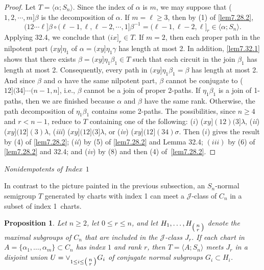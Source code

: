 \documentclass{surv-l}
\numberwithin{equation}{section}
\numberwithin{table}{section}
\numberwithin{figure}{section}
\theoremstyle{plain}
\newtheorem{proposition}[equation]{Proposition}
\theoremstyle{definition}
\begin{document}
\begin{proof} Let $T=\langle \alpha;S_{n}\rangle$. Since the index of $\alpha$ is
$m$, we may suppose that ($1, 2,\cdots,  m]\beta$ is the
decomposition of $\alpha$. If $m=\ell\geq 3$, then by (1) of
\ref{lem7.28.2},
\[
(12\cdots \ell]\beta\circ(\ell-1, \ell, \ell-2, \cdots, 1]\beta^{-1}=(\ell-1,
\ell-2, \ell]_{r}\in\langle\alpha;S_{n}\rangle.
\]
Applying 32.4, we conclude that $(ix]_{r}\in T$. If $m=2$, then
each proper path in the nilpotent part ($xy]\eta_{1}$ of
$\alpha=(xy]\eta_{1}\gamma$ has length at most 2. In addition,
\ref{lem7.32.1} shows that there exists
$\beta=(xy]\eta_{1}\beta_{1}\in T$ such that each circuit in the
join $\beta_{1}$ has length at most 2. Consequently, every path in
$(xy]\eta_{1}\beta_{1}=\beta$ has length at most 2. And since
$\beta$ and $\alpha$ have the same nilpotent part, $\beta$ cannot
be conjugate to ($12](34]\cdots(n-1, n]$, i.e., $\beta$ cannot be
a join of proper 2-paths. If $\eta_{1}\beta_{1}$ is a join of
1-paths, then we are finished because $\alpha$ and $\beta$ have
the same rank. Otherwise, the path decomposition of
$\eta_{1}\beta_{1}$ contains some 2-paths. The possibilities,
since $n \geq 4$ and $r <n -1$, reduce to $T$ containing one of
the following: ($i$) ($xy](12)(3]\lambda$, (\emph{ii})
($xy](12](3)\lambda$, (\emph{iii}) ($xy](12](3]\lambda$, or
(\emph{iv}) ($xy](12](34)\sigma$. Then ($i$) gives the result by
(4) of \ref{lem7.28.2}; (\emph{ii}) by (5) of \ref{lem7.28.2} and
Lemma 32.4; $(iii)$ by (6) of \ref{lem7.28.2} and 32.4; and
(\emph{iv}) by (8) and then (4) of~\ref{lem7.28.2}.
\end{proof}

\emph{Nonidempotents of Index~$1$}

In contrast to the picture painted in the previous subsection, an
$S_{n}$-normal semigroup $T$ generated by charts with index 1 can
meet a $\mathcal{J}$-class of $C_{n}$ in a subset of index
1~charts.

\begin{proposition}\label{prop7.32.6}
Let $n \geq 2$, let $0\leq r\leq n$, and let $H_{1},\ldots,
H_{\big(\kern0.5pt\begin{smallmatrix}{n}\\ {r}\end{smallmatrix}\kern0.5pt\big)}$
denote the maximal subgroups of $C_{n}$ that are included in the
$\mathcal{J}$-class $J_{r}$. If each chart in $A =
\{\alpha_{1},\ldots, \alpha_{m}\}\subset C_{n}$ has index $1$ and
rank $r$, then $T=\langle A;S_{n}\rangle$ meets $J_{r}$ in a
disjoint union $U=\vee_{1\leq i\leq\big(\kern0.5pt\begin{smallmatrix}n\\
r\end{smallmatrix}\kern0.5pt\big)}G_{i}$ of conjugate normal subgroups
$G_{i}\subset H_{i}$.
\end{proposition}
\end{document}
